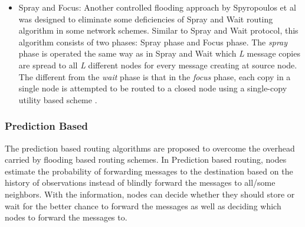 \begin{itemize}
\begin{itemize}
		\item Spray and Focus: Another controlled flooding approach by Spyropoulos et al \cite{Spyropoulos2007} was designed to eliminate some deficiencies of Spray and Wait routing algorithm in some network schemes.
		Similar to Spray and Wait protocol, this algorithm consists of two phases: Spray phase and Focus phase.
		The \emph{spray} phase is operated the same way as in Spray and Wait which \emph{L} message copies are spread to all \emph{L} different nodes for every message creating at source node.
		The different from the \emph{wait} phase is that in the \emph{focus} phase, each copy in a single node is attempted to be routed to a closed node using a single-copy utility based scheme \cite{Spyropoulos2008}.
	 
	\end{itemize}
\end{itemize}


\subsubsection{Prediction Based}
The prediction based routing algorithms are proposed to overcome the overhead carried by flooding based routing schemes. In Prediction based routing, nodes estimate the probability of forwarding messages to the destination based on the history of observations instead of blindly forward the messages to all/some neighbors. 
With the information, nodes can decide whether they should store or wait for the better chance to forward the messages as well as deciding which nodes to forward the messages to.

